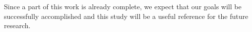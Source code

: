 Since a part of this work is already complete, we expect that our goals will be successfully accomplished and this study will be a useful reference for the future research.







